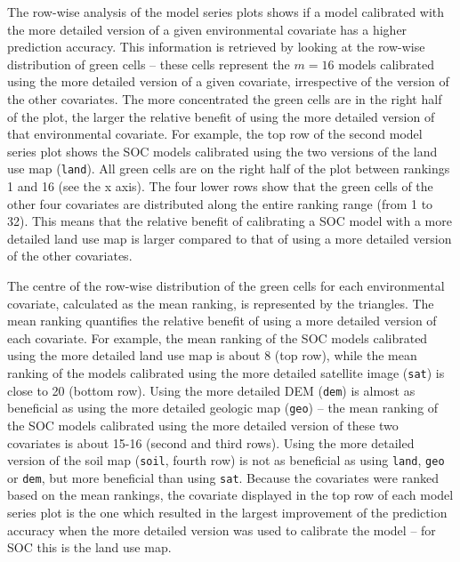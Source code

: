The row-wise analysis of the model series plots shows if a model calibrated with the more detailed version of 
a given environmental covariate has a higher prediction accuracy. This information is retrieved by looking at 
the row-wise distribution of green cells -- these cells represent the $m=16$ models calibrated using the more 
detailed version of a given covariate, irrespective of the version of the other covariates. The more 
concentrated the green cells are in the right half of the plot, the larger the relative benefit of using the
more detailed version of that environmental covariate. For example, the top row of the second model series 
plot shows the SOC models calibrated using the two versions of the land use map (\texttt{land}). All green 
cells are on the right half of the plot between rankings 1 and 16 (see the x axis). The four lower rows
show that the green cells of the other four covariates are distributed along the entire ranking range (from 1 
to 32). This means that the relative benefit of calibrating a SOC model with a more detailed land use map is 
larger compared to that of using a more detailed version of the other covariates.

The centre of the row-wise distribution of the green cells for each environmental covariate, calculated as the 
mean ranking, is represented by the triangles. The mean ranking quantifies the relative benefit of using a 
more detailed version of each covariate. For example, the mean ranking of the SOC models calibrated using the 
more detailed land use map is about 8 (top row), while the mean ranking of the models calibrated using the more 
detailed satellite image (\texttt{sat}) is close to 20 (bottom row). Using the more detailed DEM (\texttt{dem}) 
is almost as beneficial as using the more detailed geologic map (\texttt{geo}) -- the mean ranking of the SOC 
models calibrated using the more detailed version of these two covariates is about 15-16 (second and third 
rows). Using the more detailed version of the soil map (\texttt{soil}, fourth row) is not as beneficial as 
using \texttt{land}, \texttt{geo} or \texttt{dem}, but more beneficial than using \texttt{sat}. Because the 
covariates were ranked based on the mean rankings, the covariate displayed in the top row of each model series 
plot is the one which resulted in the largest improvement of the prediction accuracy when the more detailed 
version was used to calibrate the model -- for SOC this is the land use map.


